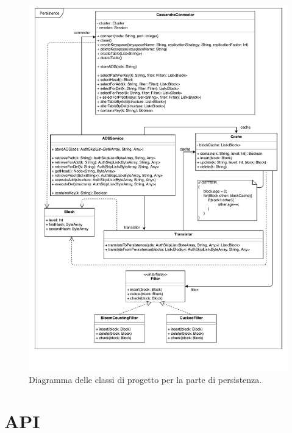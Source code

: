 	\begin{figure}
		\centering
		\includegraphics[scale=0.65]{figure/ServiceDCD.pdf}
		\caption{Diagramma delle classi di progetto per la parte di persistenza.}\label{fig:ServiceDCD}
	\end{figure}

\section{API}

%	
%	

